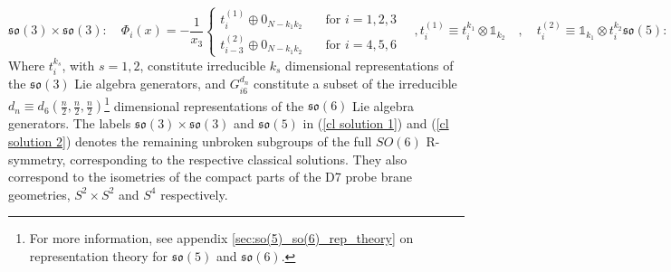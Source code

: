 \begin{subequations}
%
%
\begin{equation*}
\mathfrak{so}(3) \times \mathfrak{so}(3) :
%
\quad
%
\Phi_i(x)
=
-\frac{1}{x_3}
	\begin{cases}
		t_i^{(1)} \oplus 0_{N-k_1 k_2}
		& \quad \text{for } i = 1,2,3 \\
		
    	t_{i-3}^{(2)} \oplus 0_{N-k_1 k_2}
    	& \quad \text{for } i = 4,5,6
  \end{cases}
\quad ,
\end{equation*}
%
%
\begin{equation}\label{cl solution 1}
t_i^{(1)} \equiv t_i^{k_1} \otimes \mathbb{1}_{k_2}
%
\quad , \quad
%
t_i^{(2)} \equiv \mathbb{1}_{k_1} \otimes t_i^{k_2} 
\end{equation}
%
%

%
%
\begin{equation}\label{cl solution 2}
\mathfrak{so}(5) :
%
\quad
%
\Phi_i(x)
=
\frac{1}{\sqrt{2} x_3}
\begin{cases}
	G_{i6}^{d_n} \oplus 0_{N-d_n}
	& \quad \text{for } i = 1,2,3,4,5 \\
		
    0_{N}
    & \quad \text{for } i = 6
\end{cases}
\end{equation}
%
%
\end{subequations}
%
%
Where $t_i^{k_s}$, with $s=1,2$, constitute irreducible $k_s$ dimensional representations of the $\mathfrak{so}(3)$ Lie algebra generators, and $G_{i6}^{d_n}$ constitute a subset of the irreducible $d_n \equiv d_6 \left( \frac{n}{2},\frac{n}{2},\frac{n}{2} \right)$\footnote{For more information, see appendix \ref{sec:so(5)_so(6)_rep_theory} on representation theory for $\mathfrak{so}(5)$ and $\mathfrak{so}(6)$.} dimensional representations of the $\mathfrak{so}(6)$ Lie algebra generators. The labels $\mathfrak{so}(3) \times \mathfrak{so}(3)$ and $\mathfrak{so}(5)$ in (\ref{cl solution 1}) and (\ref{cl solution 2}) denotes the remaining unbroken subgroups of the full $SO(6)$ R-symmetry, corresponding to the respective classical solutions. They also correspond to the isometries of the compact parts of the D7 probe brane geometries, $S^2 \times S^2$ and $S^4$ respectively.
%
%
